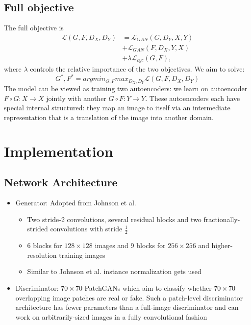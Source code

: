 \documentclass{scrartcl}
\begin{document}
\subsection*{Full objective}
The full objective is
\begin{equation}
\begin{split}
	\mathcal{L}(G, F, D_X, D_Y) &= \mathcal{L}_{GAN} (G, D_Y, X, Y)\\
	&+ \mathcal{L}_{GAN}(F, D_X, Y, X)\\
	&+ \lambda \mathcal{L}_{cyc} (G, F),
\end{split}
\end{equation}
where $\lambda$ controls the relative importance of the two objectives. We aim to solve:
\begin{equation}
	G^*, F^* = argmin_{G, F} max _{D_X, D_Y} \mathcal{L}(G, F, D_X, D_Y)
\end{equation}
The model can be viewed as training two autoencoders: we learn on autoencoder $ F \circ G: X \rightarrow X$ jointly with another $ G \circ F: Y \rightarrow Y$. These autoencoders each have special internal structured: they map an image to itself via an intermediate representation that is a translation of the image into another domain. 

\section*{Implementation}
\subsection*{Network Architecture}
\begin{itemize}
	\item
		Generator: Adopted from Johnson et al. \cite{DBLP:journals/corr/JohnsonAL16}
		\begin{itemize}
			\item
				Two stride-2 convolutions, several residual blocks and two fractionally-strided convolutions with stride $\frac{1}{2}$
			\item
				6 blocks for $128 \times 128$ images and 9 blocks for $256 \times 256$ and higher-resolution training images
			\item
				Similar to Johnson et al. instance normalization gets used
		\end{itemize}
	\item
		Discriminator: $70 \times 70$ PatchGANs \cite{DBLP:journals/corr/LiW16b} which aim to classify whether $70 \times 70$ overlapping image patches are real or fake. Such a patch-level discriminator architecture has fewer parameters than a full-image discriminator and can work on arbitrarily-sized images in a fully convolutional fashion
\end{itemize}
\end{document}
